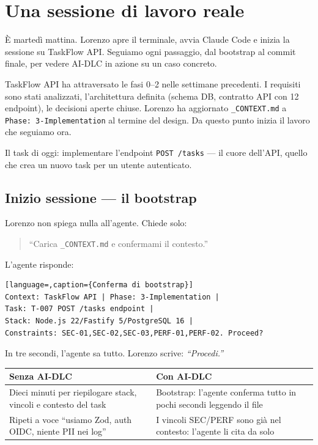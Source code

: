 ﻿%

\chapter{Una sessione di lavoro reale}
\label{ch:sessione-reale}

È martedì mattina. Lorenzo apre il terminale, avvia Claude Code e inizia la sessione su TaskFlow API. Seguiamo ogni passaggio, dal bootstrap al commit finale, per vedere AI-DLC in azione su un caso concreto.

\begin{notebox}
TaskFlow API ha attraversato le fasi 0--2 nelle settimane precedenti. I requisiti sono stati analizzati, l'architettura definita (schema DB, contratto API con 12 endpoint), le decisioni aperte chiuse. Lorenzo ha aggiornato \texttt{\_CONTEXT.md} a \texttt{Phase: 3-Implementation} al termine del design. Da questo punto inizia il lavoro che seguiamo ora.
\end{notebox}

Il task di oggi: implementare l'endpoint \texttt{POST /tasks} --- il cuore dell'API, quello che crea un nuovo task per un utente autenticato.

\section{Inizio sessione --- il bootstrap}
\label{sec:03-bootstrap}

Lorenzo non spiega nulla all'agente. Chiede solo:

\begin{quote}
``Carica \texttt{\_CONTEXT.md} e confermami il contesto.''
\end{quote}

L'agente risponde:

\begin{lstlisting}[language=,caption={Conferma di bootstrap}]
Context: TaskFlow API | Phase: 3-Implementation |
Task: T-007 POST /tasks endpoint |
Stack: Node.js 22/Fastify 5/PostgreSQL 16 |
Constraints: SEC-01,SEC-02,SEC-03,PERF-01,PERF-02. Proceed?
\end{lstlisting}

In tre secondi, l'agente sa tutto. Lorenzo scrive: \textit{``Procedi.''}

\begin{beforeafterbox}
\begin{tabularx}{\linewidth}{@{}>{\raggedright\arraybackslash}X >{\raggedright\arraybackslash}X@{}}
\textbf{Senza AI-DLC} & \textbf{Con AI-DLC} \\
\midrule
Dieci minuti per riepilogare stack, vincoli e contesto del task & Bootstrap: l'agente conferma tutto in pochi secondi leggendo il file \\[3pt]
Ripeti a voce ``usiamo Zod, auth OIDC, niente PII nei log'' & I vincoli SEC/PERF sono già nel contesto: l'agente li cita da solo \\
\end{tabularx}
\end{beforeafterbox}

